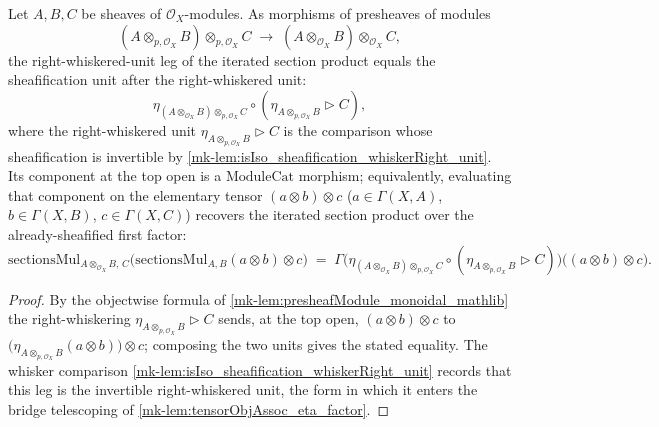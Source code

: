 \begin{lemma}\label{mk-lem:sectionsMul_whiskerRight_unit}
  \leanok

  Let \(A, B, C\) be sheaves of \(\mathcal{O}_X\)-modules. As morphisms of
  presheaves of modules
  \[
    (A \otimes_{p,\mathcal{O}_X} B) \otimes_{p,\mathcal{O}_X} C
      \;\longrightarrow\;
    (A \otimes_{\mathcal{O}_X} B) \otimes_{\mathcal{O}_X} C,
  \]
  the right-whiskered-unit leg of the iterated section product equals the
  sheafification unit after the right-whiskered unit:
  \[
    \eta_{(A \otimes_{\mathcal{O}_X} B) \otimes_{p,\mathcal{O}_X} C}
      \circ (\eta_{A \otimes_{p,\mathcal{O}_X} B} \rhd C),
  \]
  where the right-whiskered unit \(\eta_{A \otimes_{p,\mathcal{O}_X} B} \rhd C\) is
  the comparison whose sheafification is invertible by
  \ref{mk-lem:isIso_sheafification_whiskerRight_unit}. Its component at the top open is a \(\mathrm{ModuleCat}\)
  morphism; equivalently, evaluating that component on the elementary tensor
  \((a \otimes b) \otimes c\) (\(a \in \Gamma(X,A)\), \(b \in \Gamma(X,B)\),
  \(c \in \Gamma(X,C)\)) recovers the iterated section product over the
  already-sheafified first factor:
  \[
    \mathrm{sectionsMul}_{A \otimes_{\mathcal{O}_X} B,\, C}\bigl(
      \mathrm{sectionsMul}_{A,B}(a \otimes b) \otimes c\bigr)
    \;=\;
    \Gamma\bigl(
      \eta_{(A \otimes_{\mathcal{O}_X} B) \otimes_{p,\mathcal{O}_X} C}
        \circ (\eta_{A \otimes_{p,\mathcal{O}_X} B} \rhd C)
    \bigr)\bigl((a \otimes b) \otimes c\bigr).
  \]
\end{lemma}

\begin{proof}
  \leanok
  By the objectwise formula of \ref{mk-lem:presheafModule_monoidal_mathlib} the
  right-whiskering \(\eta_{A \otimes_{p,\mathcal{O}_X} B} \rhd C\) sends, at the top
  open, \((a \otimes b) \otimes c\) to
  \(\bigl(\eta_{A \otimes_{p,\mathcal{O}_X} B}(a \otimes b)\bigr) \otimes c\);
  composing the two units gives the stated equality. The whisker comparison
  \ref{mk-lem:isIso_sheafification_whiskerRight_unit} records that this leg is the
  invertible right-whiskered unit, the form in which it enters the bridge
  telescoping of \ref{mk-lem:tensorObjAssoc_eta_factor}.
\end{proof}


